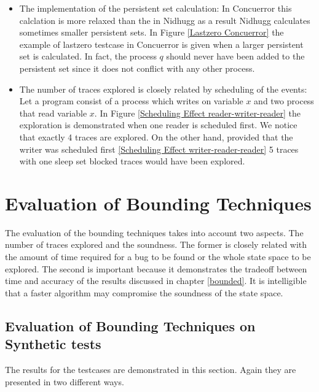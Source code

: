 \begin{itemize}
  \item The implementation of the persistent set calculation: In Concuerror this calclation is more relaxed than the in
  Nidhugg as a result Nidhugg calculates sometimes smaller persistent sets. In Figure \ref{Lastzero Concuerror} the
  example of lastzero testcase in Concuerror is given when a larger persistent set is calculated. In fact, the process
  $q$ should never have been added to the persistent set since it does not conflict with any other process.

  \item The number of traces explored is closely related by scheduling of the events: Let a program consist of a process
  which writes on variable $x$ and two process that read variable $x$. In Figure \ref{Scheduling Effect
  reader-writer-reader} the exploration is demonstrated when one reader is scheduled first. We notice that exactly 4
  traces are explored. On the other hand, provided that the writer was scheduled first \ref{Scheduling Effect
  writer-reader-reader} 5 traces with one sleep set blocked traces would have been explored.

\end{itemize}




\section{Evaluation of Bounding Techniques}
The evaluation of the bounding techniques takes into account two aspects. The number of traces explored and the
soundness. The former is closely related with the amount of time required for a bug to be found or the whole state space
to be explored. The second is important because it demonstrates the tradeoff between time and accuracy of the results
discussed in chapter \ref{bounded}. It is intelligible that a faster algorithm may compromise the soundness of the state
space.

\subsection{Evaluation of Bounding Techniques on Synthetic tests}

The results for the testcases are demonstrated in this section. Again they are presented in two different ways.

